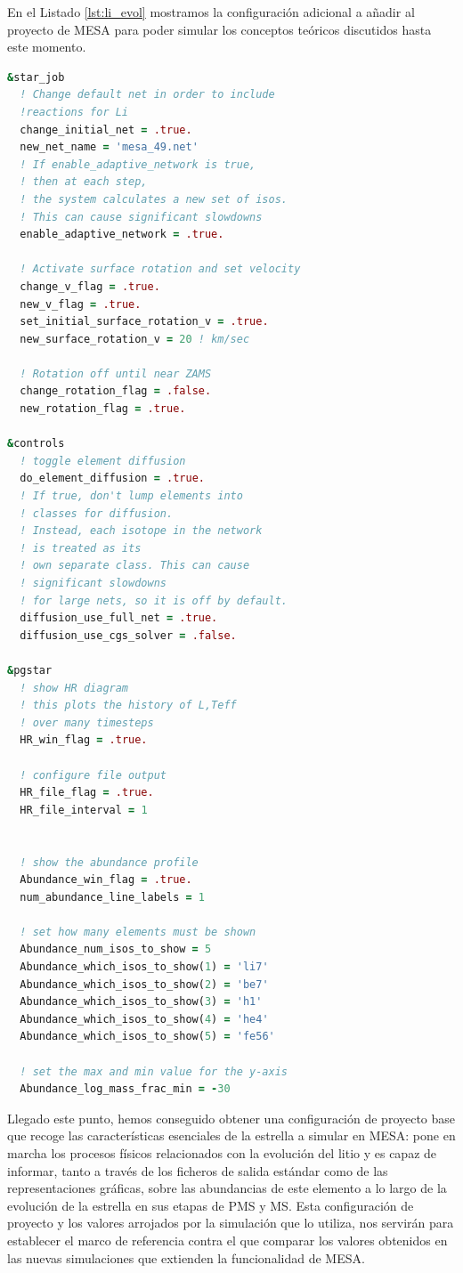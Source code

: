 En el Listado \ref{lst:li_evol} mostramos la configuración adicional a añadir al proyecto de MESA para poder simular los conceptos teóricos discutidos hasta este momento.
\begin{lstlisting}[language=Fortran, float, caption={Parametrización de los procesos relacionados con el tratamiento del litio y su evolución temporal.}, label={lst:li_evol}]
&star_job
  ! Change default net in order to include 
  !reactions for Li
  change_initial_net = .true.
  new_net_name = 'mesa_49.net'
  ! If enable_adaptive_network is true, 
  ! then at each step, 
  ! the system calculates a new set of isos. 
  ! This can cause significant slowdowns
  enable_adaptive_network = .true.

  ! Activate surface rotation and set velocity
  change_v_flag = .true.
  new_v_flag = .true.
  set_initial_surface_rotation_v = .true.
  new_surface_rotation_v = 20 ! km/sec 

  ! Rotation off until near ZAMS
  change_rotation_flag = .false.
  new_rotation_flag = .true.

&controls
  ! toggle element diffusion
  do_element_diffusion = .true.
  ! If true, don't lump elements into 
  ! classes for diffusion. 
  ! Instead, each isotope in the network 
  ! is treated as its 
  ! own separate class. This can cause 
  ! significant slowdowns 
  ! for large nets, so it is off by default.
  diffusion_use_full_net = .true.
  diffusion_use_cgs_solver = .false.

&pgstar
  ! show HR diagram
  ! this plots the history of L,Teff 
  ! over many timesteps
  HR_win_flag = .true.

  ! configure file output 
  HR_file_flag = .true.
  HR_file_interval = 1


  ! show the abundance profile
  Abundance_win_flag = .true.
  num_abundance_line_labels = 1

  ! set how many elements must be shown
  Abundance_num_isos_to_show = 5
  Abundance_which_isos_to_show(1) = 'li7'
  Abundance_which_isos_to_show(2) = 'be7'
  Abundance_which_isos_to_show(3) = 'h1'
  Abundance_which_isos_to_show(4) = 'he4'
  Abundance_which_isos_to_show(5) = 'fe56'

  ! set the max and min value for the y-axis
  Abundance_log_mass_frac_min = -30
\end{lstlisting}

Llegado este punto, hemos conseguido obtener una configuración de proyecto base que recoge las características esenciales de la estrella a simular en MESA: pone en marcha los procesos físicos relacionados con la evolución del litio y es capaz de informar, tanto a través de los ficheros de salida estándar como de las representaciones gráficas, sobre las abundancias de este elemento a lo largo de la evolución de la estrella en sus etapas de PMS y MS. Esta configuración de proyecto y los valores arrojados por la simulación que lo utiliza, nos servirán para establecer el marco de referencia contra el que comparar los valores obtenidos en las nuevas simulaciones que extienden la funcionalidad de MESA.\par



